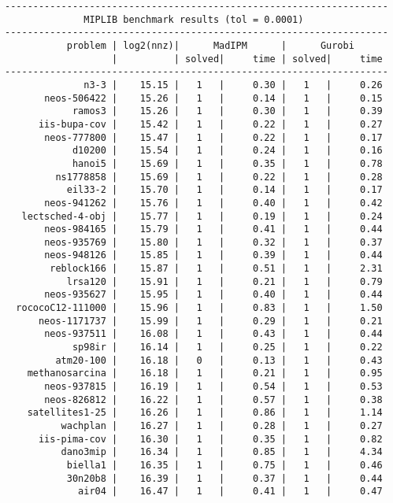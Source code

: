 \begin{verbatim}
--------------------------------------------------------------------
              MIPLIB benchmark results (tol = 0.0001)
--------------------------------------------------------------------
           problem | log2(nnz)|      MadIPM      |      Gurobi        
                   |          | solved|     time | solved|     time     
--------------------------------------------------------------------
              n3-3 |    15.15 |   1   |     0.30 |   1   |     0.26
       neos-506422 |    15.26 |   1   |     0.14 |   1   |     0.15
            ramos3 |    15.26 |   1   |     0.30 |   1   |     0.39
      iis-bupa-cov |    15.42 |   1   |     0.22 |   1   |     0.27
       neos-777800 |    15.47 |   1   |     0.22 |   1   |     0.17
            d10200 |    15.54 |   1   |     0.24 |   1   |     0.16
            hanoi5 |    15.69 |   1   |     0.35 |   1   |     0.78
         ns1778858 |    15.69 |   1   |     0.22 |   1   |     0.28
           eil33-2 |    15.70 |   1   |     0.14 |   1   |     0.17
       neos-941262 |    15.76 |   1   |     0.40 |   1   |     0.42
   lectsched-4-obj |    15.77 |   1   |     0.19 |   1   |     0.24
       neos-984165 |    15.79 |   1   |     0.41 |   1   |     0.44
       neos-935769 |    15.80 |   1   |     0.32 |   1   |     0.37
       neos-948126 |    15.85 |   1   |     0.39 |   1   |     0.44
        reblock166 |    15.87 |   1   |     0.51 |   1   |     2.31
           lrsa120 |    15.91 |   1   |     0.21 |   1   |     0.79
       neos-935627 |    15.95 |   1   |     0.40 |   1   |     0.44
  rococoC12-111000 |    15.96 |   1   |     0.83 |   1   |     1.50
      neos-1171737 |    15.99 |   1   |     0.29 |   1   |     0.21
       neos-937511 |    16.08 |   1   |     0.43 |   1   |     0.44
            sp98ir |    16.14 |   1   |     0.25 |   1   |     0.22
         atm20-100 |    16.18 |   0   |     0.13 |   1   |     0.43
    methanosarcina |    16.18 |   1   |     0.21 |   1   |     0.95
       neos-937815 |    16.19 |   1   |     0.54 |   1   |     0.53
       neos-826812 |    16.22 |   1   |     0.57 |   1   |     0.38
    satellites1-25 |    16.26 |   1   |     0.86 |   1   |     1.14
          wachplan |    16.27 |   1   |     0.28 |   1   |     0.27
      iis-pima-cov |    16.30 |   1   |     0.35 |   1   |     0.82
          dano3mip |    16.34 |   1   |     0.85 |   1   |     4.34
           biella1 |    16.35 |   1   |     0.75 |   1   |     0.46
           30n20b8 |    16.39 |   1   |     0.37 |   1   |     0.44
             air04 |    16.47 |   1   |     0.41 |   1   |     0.47

\end{verbatim}
